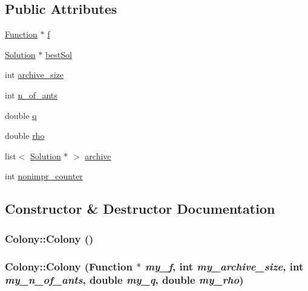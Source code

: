 \subsection*{Public Attributes}
\begin{CompactItemize}
\item 
\hyperlink{classFunction}{Function} $\ast$ \hyperlink{classColony_bf5614747e9e944cd2af6ffa83e3cf38}{f}
\item 
\hyperlink{classSolution}{Solution} $\ast$ \hyperlink{classColony_3030d0a11898b83414df4a3f8878c141}{bestSol}
\item 
int \hyperlink{classColony_6ab1bba15c25d8c2e38e2a3632d63661}{archive\_\-size}
\item 
int \hyperlink{classColony_5398847209293075291ecec0c242b19e}{n\_\-of\_\-ants}
\item 
double \hyperlink{classColony_34885da4424133c87e8c887ea9b26f14}{q}
\item 
double \hyperlink{classColony_49231f75985e7ba471f22438e5449714}{rho}
\item 
list$<$ \hyperlink{classSolution}{Solution} $\ast$ $>$ \hyperlink{classColony_74323b8c562a6e02b786be593a6ad25b}{archive}
\item 
int \hyperlink{classColony_f6d58daa2f800a0c086c43ff0a8d49d0}{nonimpr\_\-counter}
\end{CompactItemize}


\subsection{Constructor \& Destructor Documentation}
\hypertarget{classColony_af760edad97dee7263b86913d3bb4f98}{
\subsubsection{\setlength{\rightskip}{0pt plus 5cm}Colony::Colony ()}}
\label{classColony_af760edad97dee7263b86913d3bb4f98}


\hypertarget{classColony_13871283edd253b794363e33a8920f6b}{
\subsubsection{\setlength{\rightskip}{0pt plus 5cm}Colony::Colony ({\bf Function} $\ast$ {\em my\_\-f}, \/  int {\em my\_\-archive\_\-size}, \/  int {\em my\_\-n\_\-of\_\-ants}, \/  double {\em my\_\-q}, \/  double {\em my\_\-rho})}}
\label{classColony_13871283edd253b794363e33a8920f6b}


